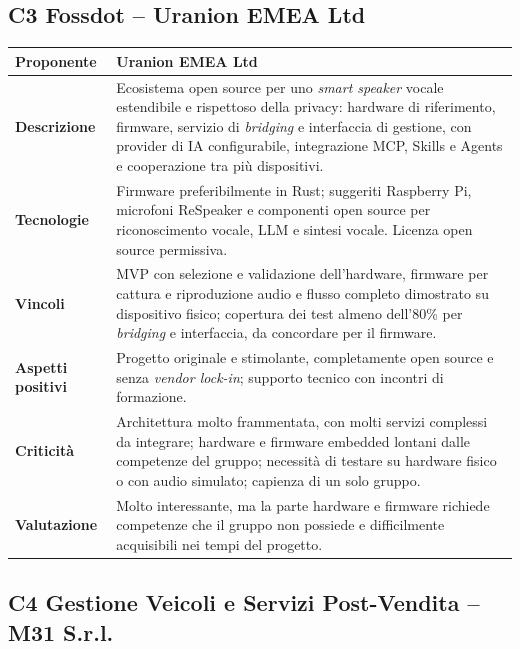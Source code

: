 \subsection{C3 Fossdot -- Uranion EMEA Ltd}

\begin{longtable}{|>{\raggedright\arraybackslash}p{3.2cm}|>{\raggedright\arraybackslash}p{\dimexpr\textwidth-3.2cm-4\tabcolsep-3\arrayrulewidth\relax}|}
    \hline
    \textbf{Proponente} & Uranion EMEA Ltd \\
    \hline
    \textbf{Descrizione} & Ecosistema open source per uno \emph{smart speaker} vocale estendibile e rispettoso della privacy: hardware di riferimento, firmware, servizio di \emph{bridging} e interfaccia di gestione, con provider di IA configurabile, integrazione MCP, Skills e Agents e cooperazione tra più dispositivi. \\
    \hline
    \textbf{Tecnologie} & Firmware preferibilmente in Rust; suggeriti Raspberry Pi, microfoni ReSpeaker e componenti open source per riconoscimento vocale, LLM e sintesi vocale. Licenza open source permissiva. \\
    \hline
    \textbf{Vincoli} & MVP con selezione e validazione dell'hardware, firmware per cattura e riproduzione audio e flusso completo dimostrato su dispositivo fisico; copertura dei test almeno dell'80\% per \emph{bridging} e interfaccia, da concordare per il firmware. \\
    \hline
    \textbf{Aspetti positivi} & Progetto originale e stimolante, completamente open source e senza \emph{vendor lock-in}; supporto tecnico con incontri di formazione. \\
    \hline
    \textbf{Criticità} & Architettura molto frammentata, con molti servizi complessi da integrare; hardware e firmware embedded lontani dalle competenze del gruppo; necessità di testare su hardware fisico o con audio simulato; capienza di un solo gruppo. \\
    \hline
    \textbf{Valutazione} & Molto interessante, ma la parte hardware e firmware richiede competenze che il gruppo non possiede e difficilmente acquisibili nei tempi del progetto. \\
    \hline
\end{longtable}

\subsection{C4 Gestione Veicoli e Servizi Post-Vendita -- M31 S.r.l.}

